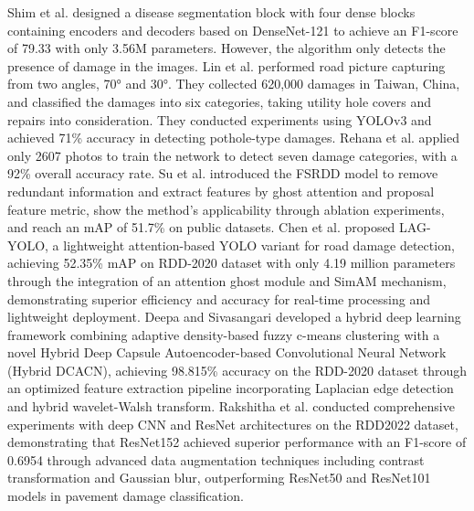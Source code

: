 \documentclass[sensors,article,submit,moreauthors]{Definitions/mdpi}
\begin{document}
    Shim et al.\citep{shim2021road} designed a disease segmentation block with four dense blocks containing encoders and decoders based on DenseNet-121 to achieve an F1-score of 79.33 with only 3.56M parameters. However, the algorithm only detects the presence of damage in the images. Lin et al.\citep{lin2021implementation} performed road picture capturing from two angles, 70° and 30°. They collected 620,000 damages in Taiwan, China, and classified the damages into six categories, taking utility hole covers and repairs into consideration. They conducted experiments using YOLOv3 and achieved 71\% accuracy in detecting pothole-type damages. Rehana et al.\citep{rehanak2022road} applied only 2607 photos to train the network to detect seven damage categories, with a 92\% overall accuracy rate. Su et al.\citep{su2022fsrdd} introduced the FSRDD model to remove redundant information and extract features by ghost attention and proposal feature metric, show the method’s applicability through ablation experiments, and reach an mAP of 51.7\% on public datasets. Chen et al.\citep{chen2024lag} proposed LAG-YOLO, a lightweight attention-based YOLO variant for road damage detection, achieving 52.35\% mAP on RDD-2020 dataset with only 4.19 million parameters through the integration of an attention ghost module and SimAM mechanism, demonstrating superior efficiency and accuracy for real-time processing and lightweight deployment. Deepa and Sivasangari\citep{deepa2023effective} developed a hybrid deep learning framework combining adaptive density-based fuzzy c-means clustering with a novel Hybrid Deep Capsule Autoencoder-based Convolutional Neural Network (Hybrid DCACN), achieving 98.815\% accuracy on the RDD-2020 dataset through an optimized feature extraction pipeline incorporating Laplacian edge detection and hybrid wavelet-Walsh transform. Rakshitha et al.\citep{rakshitha2024deep} conducted comprehensive experiments with deep CNN and ResNet architectures on the RDD2022\citep{arya2022rdd2022} dataset, demonstrating that ResNet152 achieved superior performance with an F1-score of 0.6954 through advanced data augmentation techniques including contrast transformation and Gaussian blur, outperforming ResNet50 and ResNet101 models in pavement damage classification.

\end{document}
